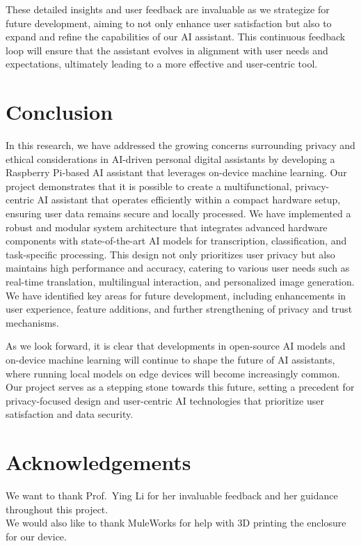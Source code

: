 \documentclass[12pt]{article}
\begin{document}
These detailed insights and user feedback are invaluable as we strategize for future development, aiming to not only enhance user satisfaction but also to expand and refine the capabilities of our AI assistant. This continuous feedback loop will ensure that the assistant evolves in alignment with user needs and expectations, ultimately leading to a more effective and user-centric tool.

\section{Conclusion}
In this research, we have addressed the growing concerns surrounding privacy and ethical considerations in AI-driven personal digital assistants by developing a Raspberry Pi-based AI assistant that leverages on-device machine learning. Our project demonstrates that it is possible to create a multifunctional, privacy-centric AI assistant that operates efficiently within a compact hardware setup, ensuring user data remains secure and locally processed.
We have implemented a robust and modular system architecture that integrates advanced hardware components with state-of-the-art AI models for transcription, classification, and task-specific processing. This design not only prioritizes user privacy but also maintains high performance and accuracy, catering to various user needs such as real-time translation, multilingual interaction, and personalized image generation.
We have identified key areas for future development, including enhancements in user experience, feature additions, and further strengthening of privacy and trust mechanisms.

As we look forward, it is clear that developments in open-source AI models and on-device machine learning will continue to shape the future of AI assistants, where running local models on edge devices will become increasingly common. Our project serves as a stepping stone towards this future, setting a precedent for privacy-focused design and user-centric AI technologies that prioritize user satisfaction and data security.


\section*{Acknowledgements}
We want to thank Prof.~Ying Li for her invaluable feedback and her guidance throughout this project. \\
We would also like to thank MuleWorks for help with 3D printing the enclosure for our device.
\end{document}
